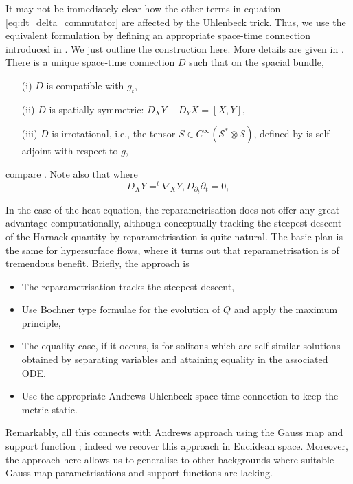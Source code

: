 It may not be immediately clear how the other terms in equation \eqref{eq:dt_delta_commutator} are affected by the Uhlenbeck trick. Thus, we use the equivalent formulation by defining an appropriate space-time connection introduced in \cite{AndrewsHopper:/2011,AndrewsBaker:/2010}. We just outline the construction here. More details are given in . There is a unique space-time connection $D$ such that on the spacial bundle,
\begin{itemize}
\item[(i)] $D$ is compatible with $g_t$,
\item[(ii)] $D$ is spatially symmetric: $D_{X}Y-D_{Y}X=[X,Y]$,
\item[(iii)] $D$ is irrotational, i.e., the tensor $S\in C^{\infty}(\mathscr{S}^{*}\otimes \mathscr{S})$, defined by
is self-adjoint with respect to $g,$
\end{itemize}
compare \cite[Thm.~6.9]{AndrewsHopper:/2011}. Note also that
where
\[
D_X Y = ^t \nabla_X Y, D_{\partial_t} \partial_t = 0,
\]

In the case of the heat equation, the reparametrisation does not offer any great advantage computationally, although conceptually tracking the steepest descent of the Harnack quantity by reparametrisation is quite natural. The basic plan is the same for hypersurface flows, where it turns out that reparametrisation is of tremendous benefit. Briefly, the approach is
\begin{itemize}
\item The reparametrisation tracks the steepest descent,
\item Use Bochner type formulae for the evolution of $Q$ and apply the maximum principle,
\item The equality case, if it occurs, is for solitons which are self-similar solutions obtained by separating variables and attaining equality in the associated ODE.
\item Use the appropriate Andrews-Uhlenbeck space-time connection to keep the metric static.
\end{itemize}
Remarkably, all this connects with Andrews approach using the Gauss map and support function \cite{Andrews:09/1994}; indeed we recover this approach in Euclidean space. Moreover, the approach here allows us to generalise to other backgrounds where suitable Gauss map parametrisations and support functions are lacking.

